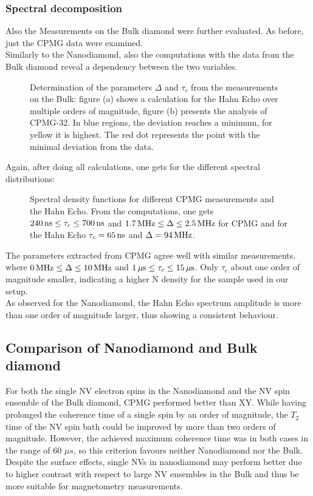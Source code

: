 \documentclass[12pt,a4paper]{article}
\begin{document}
\subsubsection{Spectral decomposition}
Also the Measurements on the Bulk diamond were further evaluated. As before, just the CPMG data were examined.\\
Similarly to the Nanodiamond, also the computations with the data from the Bulk diamond reveal a dependency between the two variables.
\begin{figure}[h!]\label{HB} 
    \caption{Determination of the parameters $\Delta$ and $\tau_c$ from the measurements on the Bulk: figure (a) shows a calculation for the Hahn Echo over multiple orders of magnitude, figure (b) presents the analysis of CPMG-32. In blue regions, the deviation reaches a minimum, for yellow it is highest. The red dot represents the point with the minimal deviation from the data.}
\end{figure}
Again, after doing all calculations, one gets for the different spectral distributions:
\begin{figure}[H]\label{sb} 
    \caption{Spectral density functions for different CPMG measurements and the Hahn Echo. From the computations, one gets $\unit[240]{ns}\leq\tau_c\leq\unit[700]{ns}$ and $\unit[1.7]{MHz}\leq\Delta\leq\unit[2.5]{MHz}$ for CPMG and for the Hahn Echo $\tau_c=\unit[65]{ns}$ and $\Delta=\unit[94]{MHz}$.}
\end{figure}
The parameters extracted from CPMG agree well with similar measurements, where $\unit[0]{MHz}\leq\Delta\leq\unit[10]{MHz}$ and $\unit[1]{\mu s}\leq\tau_c\leq\unit[15]{\mu s}$. Only $\tau_c$ about one order of magnitude smaller, indicating a higher N density for the sample used in our setup.\\
As observed for the Nanodiamond, the Hahn Echo spectrum amplitude is more than one order of magnitude larger, thus showing a consistent behaviour.
\subsection{Comparison of Nanodiamond and Bulk diamond}
For both the single NV electron spins in the Nanodiamond and the NV spin ensemble of the Bulk diamond, CPMG performed better than XY. While having prolonged the coherence time of a single spin by an order of magnitude, the $T_2$ time of the NV spin bath could be improved by more than two orders of magnitude. However, the achieved maximum coherence time was in both cases in the range of 60 $\mu s$, so this criterion favours neither Nanodiamond nor the Bulk. Despite the surface effects, single NVs in nanodiamond may perform better due to higher contrast with respect to large NV ensembles in the Bulk and thus be more suitable for magnetometry measurements.\newpage
\end{document}

